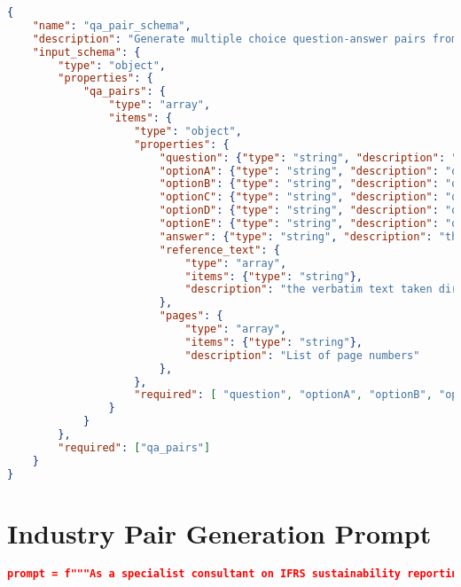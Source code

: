 \begin{appendices}
\begin{lstlisting}[language=json,firstnumber=1,label={lst:pdf_parse_prompt},caption={Schemas and prompts for PDF table and text extraction}]
\end{lstlisting}


\begin{lstlisting}[language=json,firstnumber=1,label={lst:mcq_schema},caption={Multiple-choice question output schema}]
{    
    "name": "qa_pair_schema",
    "description": "Generate multiple choice question-answer pairs from industry markdown",
    "input_schema": {
        "type": "object",
        "properties": {
            "qa_pairs": {
                "type": "array",
                "items": {
                    "type": "object",
                    "properties": {
                        "question": {"type": "string", "description": "the question"},
                        "optionA": {"type": "string", "description": "option A"},
                        "optionB": {"type": "string", "description": "option B"},
                        "optionC": {"type": "string", "description": "option C"},
                        "optionD": {"type": "string", "description": "option D"},
                        "optionE": {"type": "string", "description": "option E"},
                        "answer": {"type": "string", "description": "the correct answer option letter"},
                        "reference_text": {
                            "type": "array",
                            "items": {"type": "string"},
                            "description": "the verbatim text taken directly from the report that is used to generate the question and correct answer"
                        },
                        "pages": {
                            "type": "array",
                            "items": {"type": "string"},
                            "description": "List of page numbers"
                        },
                    },
                    "required": [ "question", "optionA", "optionB", "optionC", "optionD", "optionE", "answer", "reference_text", "pages"]
                }
            }
        },
        "required": ["qa_pairs"]
    }
}
\end{lstlisting}

\section{Industry Pair Generation Prompt}

\begin{lstlisting}[language=json,firstnumber=1,label={lst:memprompt},caption={Prompt for the generation of industry pairs for cross-industry questions, based on existing industry groups and industry descriptions taken from the markdown}]
prompt = f"""As a specialist consultant on IFRS sustainability reporting standards, please suggest 5 groups of 5 different industries that are most likely to come up when considering reporting standards. These should be industries where comparisons or relationships in sustainability reporting would be particularly relevant or insightful.


\end{lstlisting}
\end{appendices}
